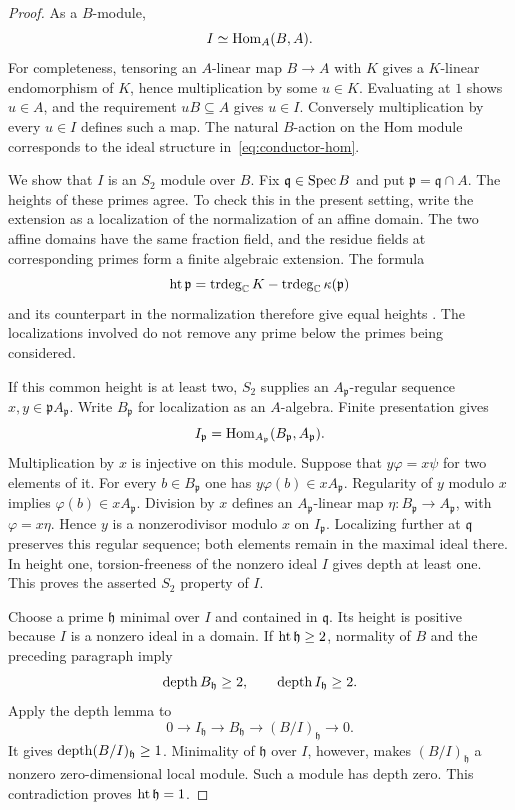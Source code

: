 \begin{proof}
As a $B$-module,
\begin{equation}\label{eq:conductor-hom}
 I\simeq\operatorname{Hom}_A(B,A).
\end{equation}
For completeness, tensoring an $A$-linear map $B\to A$ with $K$
gives a $K$-linear endomorphism of $K$, hence multiplication by some
$u\in K$. Evaluating at $1$ shows $u\in A$, and the requirement
$uB\subseteq A$ gives $u\in I$. Conversely multiplication by every
$u\in I$ defines such a map. The natural $B$-action on the Hom module
corresponds to the ideal structure in~\eqref{eq:conductor-hom}.

We show that $I$ is an $S_2$ module over $B$. Fix
$\mathfrak q\in\operatorname{Spec} B$ and put $\mathfrak p=\mathfrak q\cap A$.
The heights of these primes agree. To check this in the present setting,
write the extension as a localization of the normalization of an affine
domain. The two affine domains have the same fraction field, and the
residue fields at corresponding primes form a finite algebraic extension.
The formula
\[
 \operatorname{ht}\mathfrak p=\operatorname{trdeg}_{\mathbb C}K
                 -\operatorname{trdeg}_{\mathbb C}\kappa(\mathfrak p)
\]
and its counterpart in the normalization therefore give equal heights
\cite[Tags~00OT, 00P0 and~00P1]{stacks-project}.
The localizations involved do not remove any prime below the primes
being considered.

If this common height is at least two, $S_2$ supplies an
$A_{\mathfrak p}$-regular sequence $x,y\in\mathfrak p A_{\mathfrak p}$.
Write $B_{\mathfrak p}$ for localization as an $A$-algebra. Finite
presentation gives
\[
 I_{\mathfrak p}
   =\operatorname{Hom}_{A_{\mathfrak p}}(B_{\mathfrak p},A_{\mathfrak p}).
\]
Multiplication by $x$ is injective on this module. Suppose that
$y\varphi=x\psi$ for two elements of it. For every
$b\in B_{\mathfrak p}$ one has
$y\varphi(b)\in xA_{\mathfrak p}$. Regularity of $y$ modulo $x$
implies $\varphi(b)\in xA_{\mathfrak p}$. Division by $x$ defines
an $A_{\mathfrak p}$-linear map $\eta:B_{\mathfrak p}\to A_{\mathfrak p}$,
with $\varphi=x\eta$. Hence $y$ is a nonzerodivisor modulo $x$ on
$I_{\mathfrak p}$. Localizing further at $\mathfrak q$ preserves this
regular sequence; both elements remain in the maximal ideal there.
In height one, torsion-freeness of the nonzero ideal $I$ gives depth
at least one. This proves the asserted $S_2$ property of $I$.

Choose a prime $\mathfrak h$ minimal over $I$ and contained in
$\mathfrak q$. Its height is positive because $I$ is a nonzero ideal
in a domain. If $\operatorname{ht}\mathfrak h\geq2$, normality of $B$ and the preceding
paragraph imply
\[
 \operatorname{depth} B_{\mathfrak h}\geq2,
 \qquad \operatorname{depth} I_{\mathfrak h}\geq2.
\]
Apply the depth lemma \cite[Tag~00LX]{stacks-project} to
\[
 0\longrightarrow I_{\mathfrak h}
  \longrightarrow B_{\mathfrak h}
  \longrightarrow (B/I)_{\mathfrak h}\longrightarrow0.
\]
It gives $\operatorname{depth}(B/I)_{\mathfrak h}\geq1$. Minimality of
$\mathfrak h$ over $I$, however, makes $(B/I)_{\mathfrak h}$ a nonzero
zero-dimensional local module. Such a module has depth zero.
This contradiction proves $\operatorname{ht}\mathfrak h=1$.
\end{proof}

